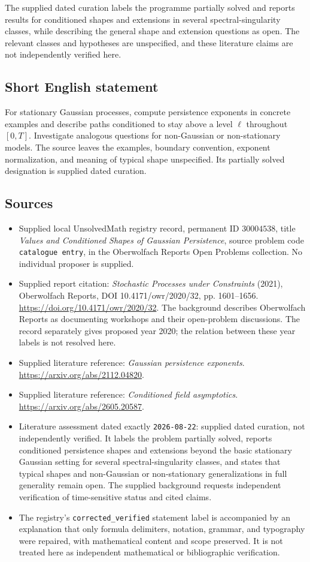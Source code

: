 \documentclass[11pt]{article}
\begin{document}
The supplied dated curation labels the programme partially solved and reports results for conditioned shapes and extensions in several spectral-singularity classes, while describing the general shape and extension questions as open. The relevant classes and hypotheses are unspecified, and these literature claims are not independently verified here.
\subsection{Short English statement}
For stationary Gaussian processes, compute persistence exponents in concrete examples and describe paths conditioned to stay above a level \(\ell\) throughout \([0,T]\). Investigate analogous questions for non-Gaussian or non-stationary models. The source leaves the examples, boundary convention, exponent normalization, and meaning of typical shape unspecified. Its partially solved designation is supplied dated curation.
\subsection{Sources}
\begin{itemize}
\item Supplied local UnsolvedMath registry record, permanent ID \(30004538\), title \emph{Values and Conditioned Shapes of Gaussian Persistence}, source problem code \texttt{catalogue entry}, in the Oberwolfach Reports Open Problems collection. No individual proposer is supplied.
\item Supplied report citation: \emph{Stochastic Processes under Constraints} (2021), Oberwolfach Reports, DOI 10.4171/owr/2020/32, pp. 1601--1656. \url{https://doi.org/10.4171/owr/2020/32}. The background describes Oberwolfach Reports as documenting workshops and their open-problem discussions. The record separately gives proposed year 2020; the relation between these year labels is not resolved here.
\item Supplied literature reference: \emph{Gaussian persistence exponents}. \url{https://arxiv.org/abs/2112.04820}.
\item Supplied literature reference: \emph{Conditioned field asymptotics}. \url{https://arxiv.org/abs/2605.20587}.
\item Literature assessment dated exactly \texttt{2026-08-22}: supplied dated curation, not independently verified. It labels the problem partially solved, reports conditioned persistence shapes and extensions beyond the basic stationary Gaussian setting for several spectral-singularity classes, and states that typical shapes and non-Gaussian or non-stationary generalizations in full generality remain open. The supplied background requests independent verification of time-sensitive status and cited claims.
\item The registry's \texttt{corrected\_verified} statement label is accompanied by an explanation that only formula delimiters, notation, grammar, and typography were repaired, with mathematical content and scope preserved. It is not treated here as independent mathematical or bibliographic verification.
\end{itemize}
\end{document}
